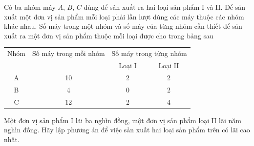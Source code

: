 \begin{bt}%
Có ba nhóm máy $A$, $B$, $C$ dùng để sản xuất ra hai loại sản phẩm I và II. Để sản xuất một đơn vị sản phẩm mỗi loại phải lần lượt dùng các máy thuộc các nhóm khác nhau. Số máy trong một nhóm và số máy của từng nhóm cần thiết để sản xuất ra một đơn vị sản phẩm thuộc mỗi loại được cho trong bảng sau
\begin{center}
	\begin{tabular}{|c|c|c|c|}
		\hline
		Nhóm& Số máy trong mỗi nhóm& \multicolumn{2}{c}{Số máy trong từng nhóm}\\
		&&Loại I&Loại II\\
		\hline
		A&10&2&2\\
		\hline
		B&4&0&2\\
		\hline
		C&12&2&4\\
		\hline
	\end{tabular}
\end{center}
Một đơn vị sản phẩm I lãi ba nghìn đồng, một đơn vị sản phẩm loại II lãi năm nghìn đồng. Hãy lập phương án để việc sản xuất hai loại sản phẩm trên có lãi cao nhất. 
\end{bt}
